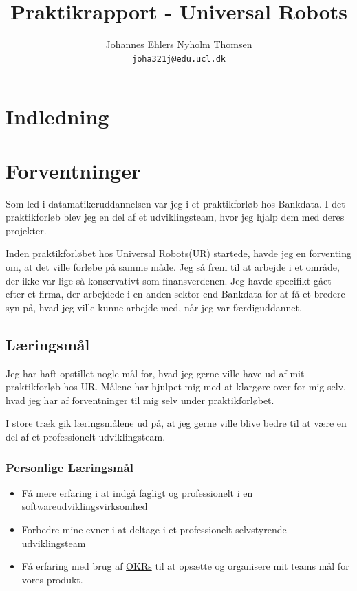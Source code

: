 \documentclass[a4paper]{article}
\title{Praktikrapport - Universal Robots}
\author
{
    Johannes Ehlers Nyholm Thomsen\\ 
    \texttt{joha321j@edu.ucl.dk}
}
\begin{document}
\maketitle

\newpage

\tableofcontents

\newpage

\section{Indledning}

\newpage
\section{Forventninger}
Som led i datamatikeruddannelsen var jeg i et praktikforløb hos Bankdata.
I det praktikforløb blev jeg en del af et udviklingsteam,
hvor jeg hjalp dem med deres projekter.

Inden praktikforløbet hos Universal Robots(UR) startede, havde jeg en forventing om,
at det ville forløbe på samme måde.
Jeg så frem til at arbejde i et område,
der ikke var lige så konservativt som finansverdenen.
Jeg havde specifikt gået efter et firma,
der arbejdede i en anden sektor end Bankdata for at få et bredere syn på,
hvad jeg ville kunne arbejde med, når jeg var færdiguddannet.

\subsection{Læringsmål}
Jeg har haft opstillet nogle mål for, 
hvad jeg gerne ville have ud af mit praktikforløb hos UR.
Målene har hjulpet mig med at klargøre over for mig selv,
hvad jeg har af forventninger til mig selv under praktikforløbet.

I store træk gik læringsmålene ud på, 
at jeg gerne ville blive bedre til at være en del af et professionelt
udviklingsteam.

\subsubsection*{Personlige Læringsmål}
\label{personligelaeringsmaal}
\begin{itemize}
    \item Få mere erfaring i at indgå fagligt og professionelt i en 
    softwareudviklingsvirksomhed
    \item Forbedre mine evner i at deltage i et professionelt selvstyrende 
    udviklingsteam
    \item Få erfaring med brug af \href{https://en.wikipedia.org/wiki/OKR}{OKRs}
     til at opsætte og organisere mit teams mål for vores produkt.
\end{itemize}
\end{document}
